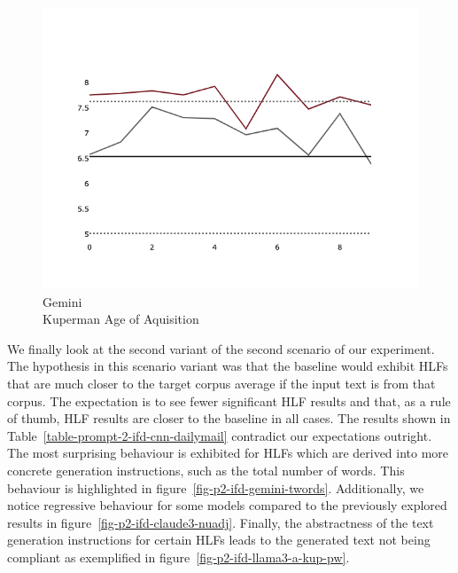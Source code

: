 \documentclass[11pt]{article}
\begin{document}
\begin{figure}[ht!]
\begin{minipage}{0.32\textwidth}
    \end{minipage}
    \hfill
    \begin{minipage}{0.32\textwidth}
        \includegraphics[width=\linewidth]{plots/prompt_2/prompt_2-gemini-cnn_dailymail/prompt_2-gemini-cnn_dailymail_a_kup_pw.png}
        \caption[center]{Gemini\\Kuperman Age of Aquisition}\label{fig-p2-gemini-a-kup-pw}
    \end{minipage}
\end{figure}

We finally look at the second variant of the second scenario of our experiment.
The hypothesis in this scenario variant was that the baseline would exhibit HLFs
that are much closer to the target corpus average if the input text is from that
corpus.
The expectation is to see fewer significant HLF results and that, as a rule of
thumb, HLF results are closer to the baseline in all cases.
The results shown in Table~\ref{table-prompt-2-ifd-cnn-dailymail} contradict our
expectations outright.
The most surprising behaviour is exhibited for HLFs which are derived into more
concrete generation instructions, such as the total number of words.
This behaviour is highlighted in figure~\ref{fig-p2-ifd-gemini-twords}.
Additionally, we notice regressive behaviour for some models compared to the
previously explored results in figure~\ref{fig-p2-ifd-claude3-nuadj}.
Finally, the abstractness of the text generation instructions for certain HLFs
leads to the generated text not being compliant as exemplified in
figure~\ref{fig-p2-ifd-llama3-a-kup-pw}.
\end{document}
